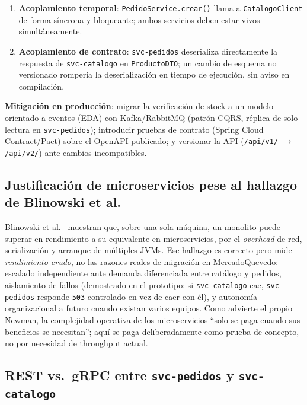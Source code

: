 \documentclass[11pt,a4paper]{article}
\begin{document}
\begin{enumerate}[leftmargin=2em]
    \item \textbf{Acoplamiento temporal}: \texttt{PedidoService.crear()}
    llama a \texttt{CatalogoClient} de forma síncrona y bloqueante; ambos
    servicios deben estar vivos simultáneamente.
    \item \textbf{Acoplamiento de contrato}: \texttt{svc-pedidos} deserializa
    directamente la respuesta de \texttt{svc-catalogo} en \texttt{ProductoDTO};
    un cambio de esquema no versionado rompería la deserialización en tiempo
    de ejecución, sin aviso en compilación.
\end{enumerate}

\textbf{Mitigación en producción}: migrar la verificación de stock a un
modelo orientado a eventos (EDA) con Kafka/RabbitMQ (patrón CQRS, réplica de
solo lectura en \texttt{svc-pedidos}); introducir pruebas de contrato
(Spring Cloud Contract/Pact) sobre el OpenAPI publicado; y versionar la API
(\texttt{/api/v1/} $\to$ \texttt{/api/v2/}) ante cambios incompatibles.

\subsection{Justificación de microservicios pese al hallazgo de Blinowski et al.}

Blinowski et al.~\cite{blinowski2022} muestran que, sobre una sola máquina,
un monolito puede superar en rendimiento a su equivalente en microservicios,
por el \emph{overhead} de red, serialización y arranque de múltiples JVMs.
Ese hallazgo es correcto pero mide \emph{rendimiento crudo}, no las razones
reales de migración en MercadoQuevedo: escalado independiente ante demanda
diferenciada entre catálogo y pedidos, aislamiento de fallos (demostrado en
el prototipo: si \texttt{svc-catalogo} cae, \texttt{svc-pedidos} responde
\texttt{503} controlado en vez de caer con él), y autonomía organizacional a
futuro cuando existan varios equipos. Como advierte el propio Newman, la
complejidad operativa de los microservicios ``solo se paga cuando sus
beneficios se necesitan''; aquí se paga deliberadamente como prueba de
concepto, no por necesidad de throughput actual.

\subsection{REST vs.\ gRPC entre \texttt{svc-pedidos} y \texttt{svc-catalogo}}
\end{document}
